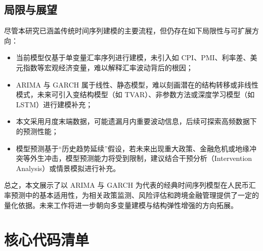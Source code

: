 \documentclass[11pt,a4paper]{article}
\begin{document}
\subsection{局限与展望}

尽管本研究已涵盖传统时间序列建模的主要流程，但仍存在如下局限性与可扩展方向：

\begin{itemize}
  \item 当前模型仅基于单变量汇率序列进行建模，未引入如 CPI、PMI、利率差、美元指数等宏观经济变量，难以解释汇率波动背后的根因；
  \item ARIMA 与 GARCH 属于线性、静态模型，难以刻画潜在的结构转移或非线性模式，未来可引入变结构模型（如 TVAR）、非参数方法或深度学习模型（如 LSTM）进行建模补充；
  \item 本文采用月度末端数据，可能遗漏月内重要波动信息，后续可探索高频数据下的预测性能；
  \item 模型预测基于“历史趋势延续”假设，若未来出现重大政策、金融危机或地缘冲突等外生冲击，模型预测能力将受到限制，建议结合干预分析（Intervention Analysis）或情景模拟进行补充。
\end{itemize}

总之，本文展示了以 ARIMA 与 GARCH 为代表的经典时间序列模型在人民币汇率预测中的基本适用性，为相关政策监测、风险评估和跨境金融管理提供了一定的量化依据。未来工作将进一步朝向多变量建模与结构弹性增强的方向拓展。

\appendix
\section{核心代码清单}
%
\end{document}
